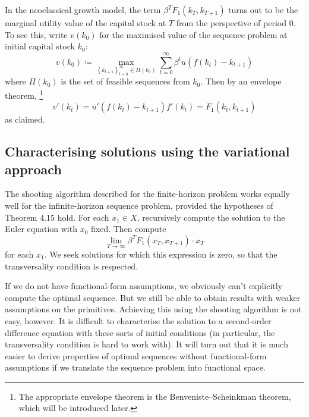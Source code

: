\documentclass[11pt,letterpaper,reqno,oneside]{article}
\begin{document}
In the neoclassical growth model, the term $\beta^T F_1(k_T,k_{T+1})$ turns out to be the marginal utility value of the capital stock at $T$ from the perspective of period $0$. To see this, write $v(k_0)$ for the maximised value of the sequence problem at initial capital stock $k_0$:
%
\begin{equation*}
	v(k_0) 
	\coloneqq \max_{ \left\{ k_{t+1} \right\}_{t=0}^\infty \in \Pi(k_0) } 
	\sum_{t=0}^\infty \beta^t u \left( f(k_t) - k_{t+1} \right)
\end{equation*}
%
where $\Pi(k_0)$ is the set of feasible sequences from $k_0$. Then by an envelope theorem,%
	\footnote{The appropriate envelope theorem is the Benveniste--Scheinkman theorem, which will be introduced later.}
%
\begin{equation*}
	v'(k_t) = u'( f(k_t) - k_{t+1} ) f'(k_t) = F_1(k_t,k_{t+1})
\end{equation*}
%
as claimed.



\subsection{Characterising solutions using the variational approach}
\label{sec:23Sep2015:characterising_solution_using_variational_approach}

The shooting algorithm described for the finite-horizon problem works equally well for the infinite-horizon sequence problem, provided the hypotheses of Theorem 4.15 hold. For each $x_1 \in X$, recursively compute the solution to the Euler equation with $x_0$ fixed. Then compute
%
\begin{equation*}
	\lim_{T\to\infty} \beta^T F_1(x_T,x_{T+1}) \cdot x_T
\end{equation*}
%
for each $x_1$. We seek solutions for which this expression is zero, so that the transversality condition is respected.

If we do not have functional-form assumptions, we obviously can't explicitly compute the optimal sequence. But we still be able to obtain results with weaker assumptions on the primitives. Achieving this using the shooting algorithm is not easy, however. It is difficult to characterise the solution to a second-order difference equation with these sorts of initial conditions (in particular, the transversality condition is hard to work with). It will turn out that it is much easier to derive properties of optimal sequences without functional-form assumptions if we translate the sequence problem into functional space.
\end{document}
